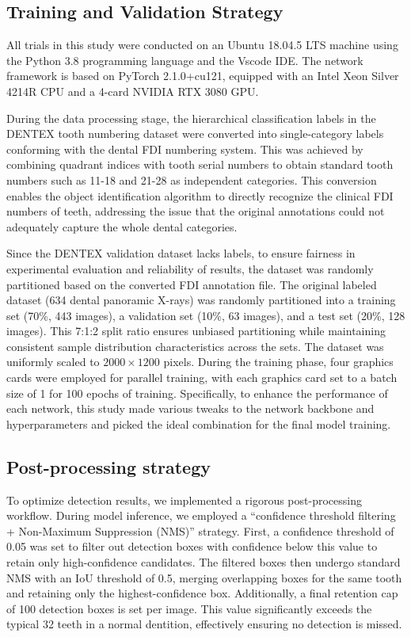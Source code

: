 \documentclass[pdflatex,sn-mathphys-num]{sn-jnl}%
\theoremstyle{thmstyleone}%
\theoremstyle{thmstyletwo}%
\theoremstyle{thmstylethree}%
\begin{document}
\subsection{Training and Validation Strategy}

All trials in this study were conducted on an Ubuntu 18.04.5 LTS machine using the Python 3.8 programming language and the Vscode IDE.  The network framework is based on PyTorch 2.1.0+cu121, equipped with an Intel Xeon Silver 4214R CPU and a 4-card NVIDIA RTX 3080 GPU.

 During the data processing stage, the hierarchical classification labels in the DENTEX tooth numbering dataset were converted into single-category labels conforming with the dental FDI numbering system.  This was achieved by combining quadrant indices with tooth serial numbers to obtain standard tooth numbers such as 11-18 and 21-28 as independent categories.  This conversion enables the object identification algorithm to directly recognize the clinical FDI numbers of teeth, addressing the issue that the original annotations could not adequately capture the whole dental categories.

 Since the DENTEX validation dataset lacks labels, to ensure fairness in experimental evaluation and reliability of results, the dataset was randomly partitioned based on the converted FDI annotation file. The original labeled dataset (634 dental panoramic X-rays) was randomly partitioned into a training set (70\%, 443 images), a validation set (10\%, 63 images), and a test set (20\%, 128 images). This 7:1:2 split ratio ensures unbiased partitioning while maintaining consistent sample distribution characteristics across the sets.   The dataset was uniformly scaled to $2000\times1200$ pixels.  During the training phase, four graphics cards were employed for parallel training, with each graphics card set to a batch size of 1 for 100 epochs of training.  Specifically, to enhance the performance of each network, this study made various tweaks to the network backbone and hyperparameters and picked the ideal combination for the final model training.

\subsection{Post-processing strategy}

To optimize detection results, we implemented a rigorous post-processing workflow. During model inference, we employed a “confidence threshold filtering + Non-Maximum Suppression (NMS)” strategy. First, a confidence threshold of 0.05 was set to filter out detection boxes with confidence below this value to retain only high-confidence candidates. The filtered boxes then undergo standard NMS with an IoU threshold of 0.5, merging overlapping boxes for the same tooth and retaining only the highest-confidence box. Additionally, a final retention cap of 100 detection boxes is set per image. This value significantly exceeds the typical 32 teeth in a normal dentition, effectively ensuring no detection is missed.
\end{document}
